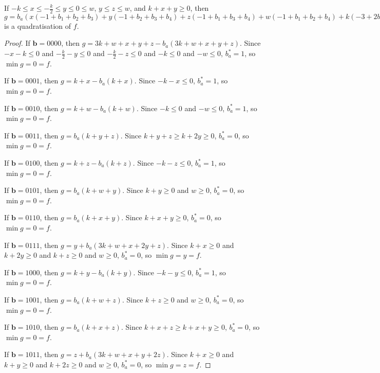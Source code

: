 \documentclass[11pt]{scrartcl}
\newcommand{\vc}[1]{\boldsymbol{#1}}
\begin{document}
\begin{lemma}
	\label{case3}
	If $-k\le x \le -\frac{k}{2} \le y \le 0  \le w $, $y \le z \le w$, and $k + x + y \ge 0$, then $g = b_a(x(-1+b_1+b_2+b_3)+y(-1+b_2+b_3+b_4)+z(-1+b_1+b_3+b_4)+w(-1+b_1+b_2+b_4)+k(-3+2b_1+2b_2+2b_3+2b_4))+x(+1 -b_1-b_2-b_3+b_1b_2+b_1b_3+b_2b_3)+y(+1 -b_2-b_3-b_4+b_2b_3+b_2b_4+b_3b_4)+z(+1 -b_1-b_3-b_4+b_1b_3+b_1b_4+b_3b_4)+w(+1 -b_1-b_2-b_4+b_1b_2+b_1b_4+b_2b_4)+k(+3 -2 b_1-2 b_2-2 b_3-2 b_4+b_1b_2+b_1b_3+b_1b_4+b_2b_3+b_2b_4+b_3b_4)$ 
	is a quadratisation of $f$.
 \end{lemma}

\begin{proof}
	If $\vc b = 0000$, then $g = 3k + w + x + y + z - b_a(3k + w + x + y + z)$. Since $-x - k \le 0$ and $ -\frac{k}{2} - y \le 0$ and $-\frac{k}{2} - z \le 0$ 
and $-k \le 0$ and $-w \le 0$, $b_a^* = 1$, so $\min g = 0 = f$.

If $\vc b = 0001$, then $g = k + x - b_a(k + x)$. 
Since $-k -x \le 0$, $b_a^* = 1$, so $\min g = 0 = f$.

If $\vc b = 0010$, then $g = k + w - b_a(k + w)$.
Since $-k \le 0$ and $-w \le 0$, $b_a^* = 1$, so $\min g = 0 = f$.

If $\vc b = 0011$, then $g = b_a(k + y + z)$.
Since $k + y + z \ge k + 2y \ge 0 $, $b_a^* = 0$, so $\min g = 0 = f$.

If $\vc b = 0100$, then $g = k + z - b_a(k + z)$.
Since $-k - z \le 0$, $b_a^* = 1$, so $\min g = 0 = f$.

If $\vc b = 0101$, then $g = b_a(k + w + y)$.
Since $k + y \ge 0 $ and $w \ge 0$, $b_a^* = 0 $, so $\min g = 0 = f$.

If $\vc b = 0110$, then $g = b_a(k + x + y)$. Since $k + x + y \ge 0$, $b_a^* = 0$, so $\min g = 0 = f$.

If $\vc b = 0111$, then $g = y + b_a(3k + w + x + 2y + z)$. Since $k + x \ge 0$ and $k + 2y \ge 0$ and $k + z\ge 0 $ and $w  \ge 0$, 
$b_a^* = 0$, so $\min g = y = f$.

If $\vc b = 1000$, then $g = k + y - b_a(k + y)$. Since $-k - y \le 0$, $b_a^* = 1$, so $\min g = 0 = f$.

If $\vc b = 1001$, then $g = b_a(k + w + z)$.
Since $k + z \ge 0$ and $w \ge 0$, $b_a^* = 0$, so $\min g = 0 = f$.

If $\vc b = 1010$, then $g = b_a(k + x + z)$.
Since $k + x + z \ge k + x + y \ge 0 $, $b_a^* = 0$, so $\min g = 0 = f$.

If $\vc b = 1011$, then $g = z + b_a(3k + w + x + y + 2z)$.
Since $k + x \ge 0$ and $k + y \ge 0$ and $k + 2z \ge 0 $ and $w \ge 0 $, $b_a^* = 0$, so $\min g = z = f$.


\end{proof}
\end{document}
